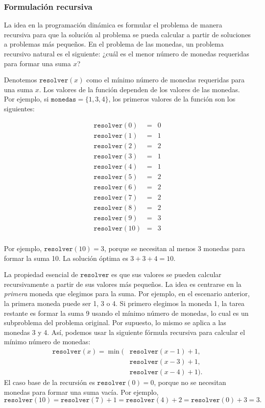 \subsubsection{Formulación recursiva}

La idea en la programación dinámica es
formular el problema de manera recursiva para que
la solución al problema se pueda
calcular a partir de soluciones a problemas
más pequeños.
En el problema de las monedas, un problema recursivo
natural es el siguiente:
¿cuál es el menor número de monedas
requeridas para formar una suma $x$?

Denotemos $\texttt{resolver}(x)$
como el mínimo
número de monedas requeridas para una suma $x$.
Los valores de la función dependen de los
valores de las monedas.
Por ejemplo, si $\texttt{monedas} = \{1,3,4\}$,
los primeros valores de la función son los siguientes:

\[
\begin{array}{lcl}
\texttt{resolver}(0) & = & 0 \\
\texttt{resolver}(1) & = & 1 \\
\texttt{resolver}(2) & = & 2 \\
\texttt{resolver}(3) & = & 1 \\
\texttt{resolver}(4) & = & 1 \\
\texttt{resolver}(5) & = & 2 \\
\texttt{resolver}(6) & = & 2 \\
\texttt{resolver}(7) & = & 2 \\
\texttt{resolver}(8) & = & 2 \\
\texttt{resolver}(9) & = & 3 \\
\texttt{resolver}(10) & = & 3 \\
\end{array}
\]

Por ejemplo, $\texttt{resolver}(10)=3$,
porque se necesitan al menos 3 monedas
para formar la suma 10.
La solución óptima es $3+3+4=10$.

La propiedad esencial de $\texttt{resolver}$ es
que sus valores se pueden
calcular recursivamente a partir de sus valores más pequeños.
La idea es centrarse en la \emph{primera}
moneda que elegimos para la suma.
Por ejemplo, en el escenario anterior,
la primera moneda puede ser 1, 3 o 4.
Si primero elegimos la moneda 1,
la tarea restante es formar la suma 9
usando el mínimo número de monedas,
lo cual es un subproblema del problema original.
Por supuesto, lo mismo se aplica a las monedas 3 y 4.
Así, podemos usar la siguiente fórmula recursiva
para calcular el mínimo número de monedas:
\begin{equation*}
\begin{split}
\texttt{resolver}(x) = \min( & \texttt{resolver}(x-1)+1, \\
                           & \texttt{resolver}(x-3)+1, \\
                           & \texttt{resolver}(x-4)+1).
\end{split}
\end{equation*}
El caso base de la recursión es $\texttt{resolver}(0)=0$,
porque no se necesitan monedas para formar una suma vacía.
Por ejemplo,
\[ \texttt{resolver}(10) = \texttt{resolver}(7)+1 = \texttt{resolver}(4)+2 = \texttt{resolver}(0)+3 = 3.\]

